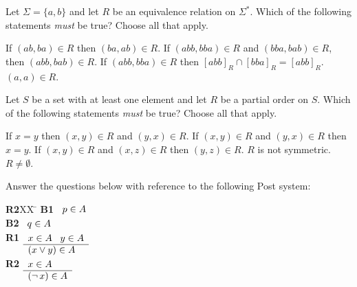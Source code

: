 \documentclass[addpoints]{exam}
\newcommand{\tf}[1][{}]{%
\fillin[#1][0.25in]%
}
\begin{document}
\begin{questions}
\question[4] Let $\Sigma = \{a,b\}$ and let $R$ be an equivalence relation on $\Sigma^*$. 
Which of the following statements \emph{must} be true? Choose all that apply.

\begin{checkboxes}
\CorrectChoice If $(ab, ba) \in R$ then $(ba,ab) \in R$.
\CorrectChoice If $(abb,bba) \in R$ and $(bba,bab) \in R$, then $(abb,bab) \in R$.
\CorrectChoice If $(abb,bba) \in R$ then $[abb]_R \cap [bba]_R = [abb]_R$.
\CorrectChoice $(a,a) \in R$.
\end{checkboxes}

\vspace{10mm}
\question[5]
Let $S$ be a set with at least one element and let $R$ be a partial order on $S$. 
Which of the following statements \emph{must} be true? Choose all that apply.

\begin{checkboxes}
\CorrectChoice If $x = y$ then $(x,y) \in R$ and $(y,x) \in R$. 
\CorrectChoice If $(x,y) \in R$ and $(y,x) \in R$ then $x = y$. 
\choice If $(x,y) \in R$ and $(x,z) \in R$ then $(y,z) \in R$. 
\choice $R$ is not symmetric. 
\CorrectChoice $R \neq \emptyset$.
\end{checkboxes}






%
\clearpage
\question\label{q:plpost} Answer the questions below with reference to the following Post
system: 
\begin{tabbing}
{\bf R2}XX \=  \kill
{\bf B1} \>
        \(\begin{array}[t]{l}
        p \in A
        \end{array}\) \\[2ex]
{\bf B2} \>
        \(\begin{array}[t]{l}
        q \in A
        \end{array}\) \\[2ex]
{\bf R1} \>
        \(\begin{array}[t]{l}
        x \in A \;\;\;y \in A \\
        \hline
        (x \lor y) \in A
        \end{array}\) \\[2ex]
{\bf R2} \>
        \(\begin{array}[t]{l}
        x \in A \\
        \hline
        (\mathop{\neg} x) \in A
        \end{array}\) 
\end{tabbing}
\begin{parts}

\end{parts}
\end{questions}
\end{document}
